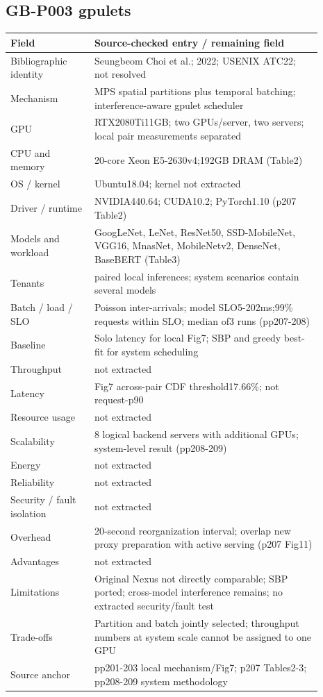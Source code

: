 \documentclass[12pt,a4paper]{article}
\begin{document}
\subsection{GB-P003 gpulets}
\begin{longtable}{p{0.24\linewidth}p{0.65\linewidth}}
\toprule
Field & Source-checked entry /\allowbreak{} remaining field\\\midrule
\endhead
Bibliographic identity & Seungbeom Choi et al.; 2022; USENIX ATC22; not resolved\\
Mechanism & MPS spatial partitions plus temporal batching; interference-aware gpulet scheduler\\
GPU & RTX2080Ti11GB; two GPUs/\allowbreak{}server, two servers; local pair measurements separated\\
CPU and memory & 20-core Xeon E5-2630v4;192GB DRAM (Table2)\\
OS /\allowbreak{} kernel & Ubuntu18.04; kernel not extracted\\
Driver /\allowbreak{} runtime & NVIDIA440.64; CUDA10.2; PyTorch1.10 (p207 Table2)\\
Models and workload & GoogLeNet, LeNet, ResNet50, SSD-MobileNet, VGG16, MnasNet, MobileNetv2, DenseNet, BaseBERT (Table3)\\
Tenants & paired local inferences; system scenarios contain several models\\
Batch /\allowbreak{} load /\allowbreak{} SLO & Poisson inter-arrivals; model SLO5-202ms;99\% requests within SLO; median of3 runs (pp207-208)\\
Baseline & Solo latency for local Fig7; SBP and greedy best-fit for system scheduling\\
Throughput & not extracted\\
Latency & Fig7 across-pair CDF threshold17.66\%; not request-p90\\
Resource usage & not extracted\\
Scalability & 8 logical backend servers with additional GPUs; system-level result (pp208-209)\\
Energy & not extracted\\
Reliability & not extracted\\
Security /\allowbreak{} fault isolation & not extracted\\
Overhead & 20-second reorganization interval; overlap new proxy preparation with active serving (p207 Fig11)\\
Advantages & not extracted\\
Limitations & Original Nexus not directly comparable; SBP ported; cross-model interference remains; no extracted security/\allowbreak{}fault test\\
Trade-offs & Partition and batch jointly selected; throughput numbers at system scale cannot be assigned to one GPU\\
Source anchor & pp201-203 local mechanism/\allowbreak{}Fig7; p207 Tables2-3; pp208-209 system methodology\\
\bottomrule
\end{longtable}
\end{document}
